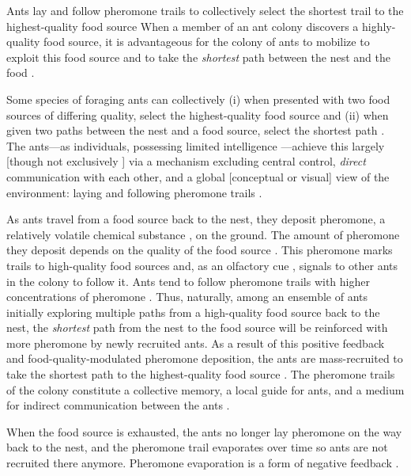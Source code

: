 \documentclass[11pt, oneside]{article}
\begin{document}
\begin{mybox}[label=box:qcmzifs, breakable]{Ants lay and follow pheromone trails to collectively select the shortest trail to the highest-quality food source}
When a member of an ant colony discovers a highly-quality food source, it is advantageous for the colony of ants to mobilize to exploit this food source \cite{deneubourg1983probabilistic} and to take the \emph{shortest} path between the nest and the food \cite{goss1989self}.

Some species of foraging ants can collectively 
(i) when presented with two food sources of differing quality, select the highest-quality food source \cite{beckers1993modulation} and
(ii) when given two paths between the nest and a food source, select the shortest path \cite{goss1989self}.
The ants---as individuals, possessing limited intelligence \cite{edelstein1995trail}---achieve this largely [though not exclusively \cite{evison2008combined,czaczkes2015trail}] via a mechanism excluding central control, \emph{direct} communication with each other, and a global [conceptual or visual] view of the environment: laying and following pheromone trails \cite{czaczkes2015trail}.

As ants travel from a food source back to the nest, they deposit pheromone, a relatively volatile chemical substance \cite{david2009trail}, on the ground. 
The amount of pheromone they deposit depends on the quality of the food source \cite{beckers1993modulation}. 
This pheromone marks trails to high-quality food sources and, as an olfactory cue \cite{knaden2016sensory}, signals to other ants in the colony to follow it. \cite{david2009trail,deneubourg1990self}
Ants tend to follow pheromone trails with higher concentrations of pheromone \cite{czaczkes2015trail}.
Thus, naturally, among an ensemble of ants initially exploring multiple paths from a high-quality food source back to the nest, the \emph{shortest} path from the nest to the food source will be reinforced with more pheromone by newly recruited ants. 
As a result of this positive feedback and food-quality-modulated pheromone deposition, the ants are mass-recruited to take the shortest path to the highest-quality food source \cite{goss1989self,jackson2006communication}.
The pheromone trails of the colony constitute a collective memory, a local guide for ants, and a medium for indirect communication between the ants \cite{jackson2006communication}.

When the food source is exhausted, the ants no longer lay pheromone on the way back to the nest, and the pheromone trail evaporates over time \cite{david2009trail,van2011temperature} so ants are not recruited there anymore. Pheromone evaporation is a form of negative feedback \cite{jackson2006communication}.


\end{mybox}
\end{document}
